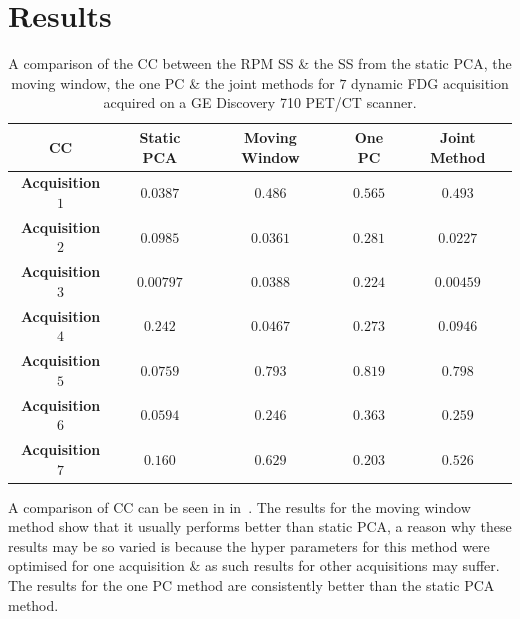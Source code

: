 \section{Results} \label{sec:results}
    \begin{table}
        \centering
        \captionsetup{singlelinecheck=false, justification=centering}
        \caption{A comparison of the \gls{CC} between the \gls{RPM} \gls{SS} \& the \gls{SS} from the static \gls{PCA}, the moving window, the one \gls{PC} \& the joint methods for $7$ dynamic \gls{FDG} acquisition acquired on a \gls{GE} Discovery 710 \gls{PET}/\gls{CT} scanner.}
        
        \resizebox*{0.75\linewidth}{!}
        {
            \begin{tabular}{||c|cccc||}
                \hline
                \textbf{\gls{CC}} & \textbf{Static \gls{PCA}} & \textbf{Moving Window} & \textbf{One \gls{PC}} & \textbf{Joint Method} \\
                \hline
                \textbf{Acquisition $1$}   & $0.0387$  & $0.486$  & $0.565$  & $0.493$   \\
                \textbf{Acquisition $2$}   & $0.0985$  & $0.0361$ & $0.281$  & $0.0227$  \\
                \textbf{Acquisition $3$}   & $0.00797$ & $0.0388$ & $0.224$  & $0.00459$ \\
                \textbf{Acquisition $4$}   & $0.242$   & $0.0467$ & $0.273$  & $0.0946$  \\
                \textbf{Acquisition $5$}   & $0.0759$  & $0.793$  & $0.819$  & $0.798$   \\
                \textbf{Acquisition $6$}   & $0.0594$  & $0.246$  & $0.363$  & $0.259$   \\
                \textbf{Acquisition $7$}   & $0.160$   & $0.629$  & $0.203$  & $0.526$   \\
                \hline
            \end{tabular}
        }
        \label{tab:cross_correlation}
    \end{table}
    
    A comparison of \gls{CC} can be seen in in~. The results for the moving window method show that it usually performs better than static \gls{PCA}, a reason why these results may be so varied is because the hyper parameters for this method were optimised for one acquisition \& as such results for other acquisitions may suffer. The results for the one \gls{PC} method are consistently better than the static \gls{PCA} method.
    

